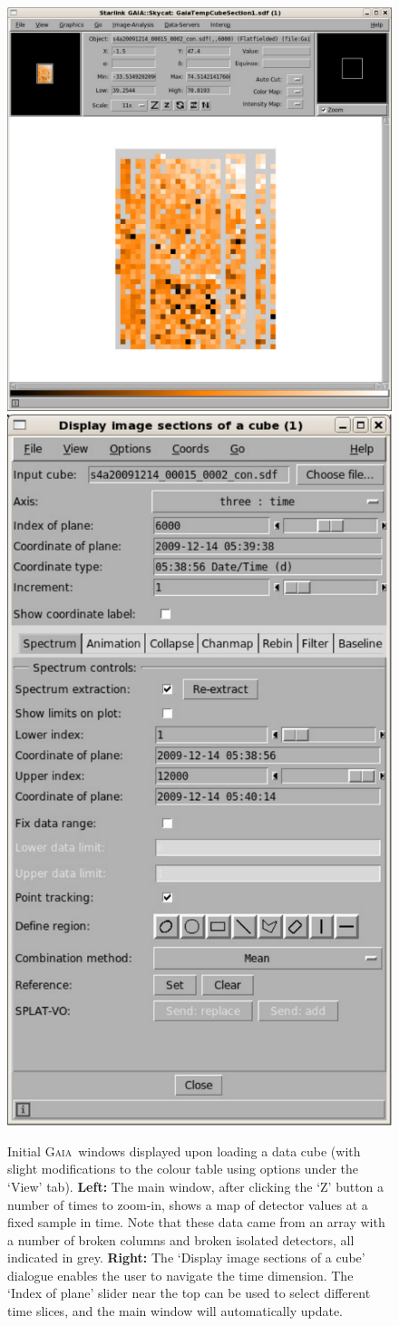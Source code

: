\documentclass[twoside,11pt]{article}
\newcommand{\gaia}{\xref{\textsc{Gaia}}{sun214}{}}
\newcommand{\xref}[3]{#1}
\renewcommand{\_}{\texttt{\symbol{95}}}
\begin{document}
\begin{figure}
\begin{center}
\includegraphics[width=0.61\linewidth]{sc19_gaia_main}\hspace{0.03\linewidth}
\includegraphics[width=0.33\linewidth]{sc19_gaia_sections}
\caption{Initial \gaia\ windows displayed upon loading a data cube
  (with slight modifications to the colour table using options under
  the `View' tab). {\bf Left:} The main window, after clicking the `Z'
  button a number of times to zoom-in, shows a map of detector values
  at a fixed sample in time. Note that these data came from an array
  with a number of broken columns and broken isolated detectors, all
  indicated in grey. {\bf Right:} The `Display image sections of a
  cube' dialogue enables the user to navigate the time dimension. The
  `Index of plane' slider near the top can be used to select different
  time slices, and the main window will automatically update.}
\label{fig:gaia_main}
\end{center}
\end{figure}
\end{document}

